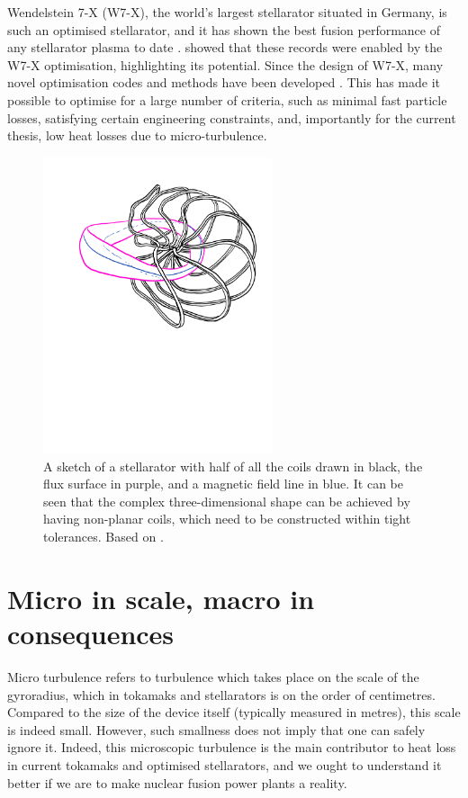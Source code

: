 Wendelstein 7-X (W7-X), the world's largest stellarator situated in Germany, is such an optimised stellarator, and it has shown the best fusion performance of any stellarator plasma to date \cite{wolf2017major,wolf2019performance}. \citet{beidler2021demonstration} showed that these records were enabled by the W7-X optimisation, highlighting its potential. Since the design of W7-X, many novel optimisation codes and methods have been developed \cite{wagner1998stellarators,spong2001physics,kovari2014process,kovari2016process,drevlak2018optimisation,dudt2020desc,landreman2021simsopt,mcgreivy2021optimized}. This has made it possible to optimise for a large number of criteria, such as minimal fast particle losses, satisfying certain engineering constraints, and, importantly for the current thesis, low heat losses due to micro-turbulence.

\begin{figure}
    \centering
    \includegraphics[width=0.6\textwidth]{3_chapters/0_introduction/img/stellarator-sketch.pdf}
    \caption{A sketch of a stellarator with half of all the coils drawn in black, the flux surface in purple, and a magnetic field line in blue. It can be seen that the complex three-dimensional shape can be achieved by having non-planar coils, which need to be constructed within tight tolerances. Based on \citet{wechsung2022precise}.}
    \label{fig: sketch stellarator}
\end{figure}



\section{Micro in scale, macro in consequences}
\label{sec: chap1 background}
Micro turbulence refers to turbulence which takes place on the scale of the gyroradius, which in tokamaks and stellarators is on the order of centimetres. Compared to the size of the device itself (typically measured in metres), this scale is indeed small. However, such smallness does not imply that one can safely ignore it.  Indeed, this microscopic turbulence is the main contributor to heat loss in current tokamaks and optimised stellarators, and we ought to understand it better if we are to make nuclear fusion power plants a reality. \par  

